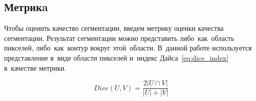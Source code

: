 \subsection{Метрикa}

Чтобы оценить качество сегментации, введем метрику оценки качества сегментации. Результат сегментации 
можно представить либо~как~область пикселей, либо~как~контур вокруг этой~области. В~данной работе 
используется представление в~виде области пикселей и~индекс Дайса~\eqref{eq:dice_index} в~качестве метрики. 

\begin{equation}
\label{eq:dice_index}
  Dice(U,V) = \frac{2|U\cap{}V|}{|U| + |V|}
\end{equation}
